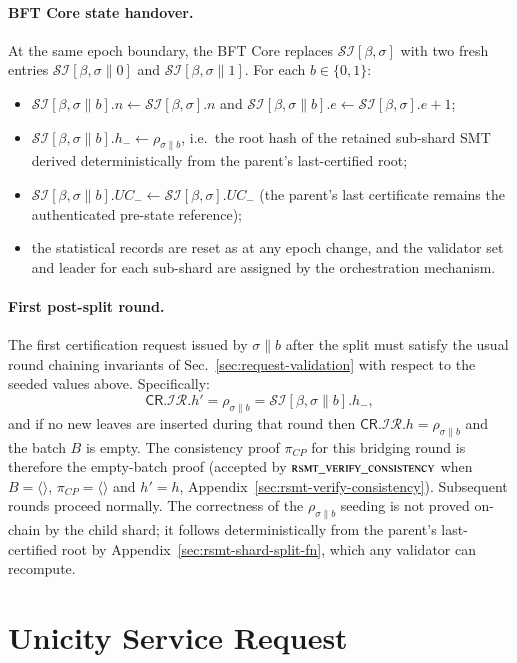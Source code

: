 \paragraph{BFT Core state handover.} At the same epoch boundary, the BFT Core replaces $\mathcal{SI}[\beta,\sigma]$ with two fresh entries $\mathcal{SI}[\beta,\sigma\|0]$ and $\mathcal{SI}[\beta,\sigma\|1]$. For each $b\in\{0,1\}$:
\begin{itemize}
	\item $\mathcal{SI}[\beta,\sigma\|b].n \gets \mathcal{SI}[\beta,\sigma].n$ and $\mathcal{SI}[\beta,\sigma\|b].e \gets \mathcal{SI}[\beta,\sigma].e + 1$;
	\item $\mathcal{SI}[\beta,\sigma\|b].h_- \gets \rho_{\sigma\|b}$, i.e.\ the root hash of the retained sub-shard SMT derived deterministically from the parent's last-certified root;
	\item $\mathcal{SI}[\beta,\sigma\|b].UC_- \gets \mathcal{SI}[\beta,\sigma].UC_-$ (the parent's last certificate remains the authenticated pre-state reference);
	\item the statistical records are reset as at any epoch change, and the validator set and leader for each sub-shard are assigned by the orchestration mechanism.
\end{itemize}

\paragraph{First post-split round.} The first certification request issued by $\sigma\|b$ after the split must satisfy the usual round chaining invariants of Sec.~\ref{sec:request-validation} with respect to the seeded values above. Specifically:
\[
\mathsf{CR}.\mathcal{IR}.h' = \rho_{\sigma\|b} = \mathcal{SI}[\beta,\sigma\|b].h_-,
\]
and if no new leaves are inserted during that round then $\mathsf{CR}.\mathcal{IR}.h = \rho_{\sigma\|b}$ and the batch $B$ is empty. The consistency proof $\pi_{CP}$ for this bridging round is therefore the empty-batch proof (accepted by $\textsc{rsmt\_verify\_consistency}$ when $B = \langle\rangle$, $\pi_{CP} = \langle\rangle$ and $h' = h$, Appendix~\ref{sec:rsmt-verify-consistency}). Subsequent rounds proceed normally. The correctness of the $\rho_{\sigma\|b}$ seeding is not proved on-chain by the child shard; it follows deterministically from the parent's last-certified root by Appendix~\ref{sec:rsmt-shard-split-fn}, which any validator can recompute.

\section{Unicity Service Request}

